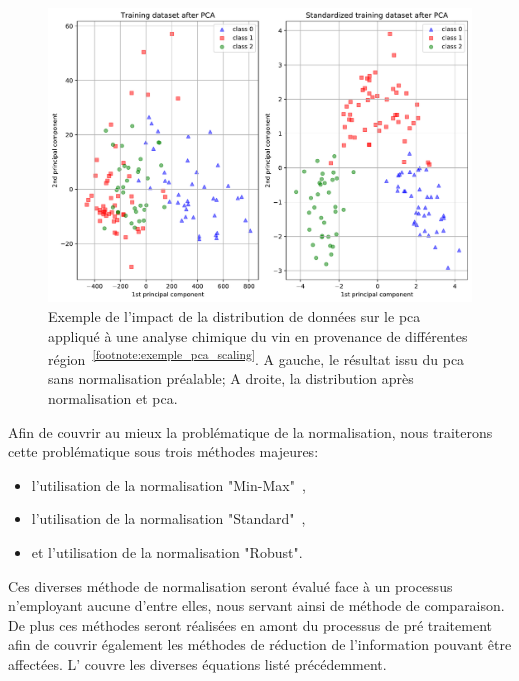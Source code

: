 \begin{figure}[H]
    \centering
    \includegraphics[width=\linewidth]{contents/chapter_4/resources/example_pca_scaling.pdf}
    \caption{Exemple de l'impact de la distribution de données sur le \gls{pca} appliqué à une analyse chimique du vin en provenance de différentes région~\textsuperscript{\ref{footnote:exemple_pca_scaling}}. A gauche, le résultat issu du \gls{pca} sans normalisation préalable; A droite, la distribution après normalisation et \gls{pca}.}
    \label{fig:exemple_pca_scaling}
\end{figure}\par

\addtocounter{footnote}{1}

Afin de couvrir au mieux la problématique de la normalisation, nous traiterons cette problématique sous trois méthodes majeures:
\begin{itemize}
    \item l'utilisation de la normalisation "Min-Max"~\cite{Juszczak2002},
    \item l'utilisation de la normalisation "Standard"~\cite{Celebi2007}, 
    \item et l'utilisation de la normalisation "Robust". 
\end{itemize}
Ces diverses méthode de normalisation seront évalué face à un processus n'employant aucune d'entre elles, nous servant ainsi de méthode de comparaison. De plus ces méthodes seront réalisées en amont du processus de pré traitement afin de couvrir également les méthodes de réduction de l'information pouvant être affectées. L' couvre les diverses équations listé précédemment.\par

